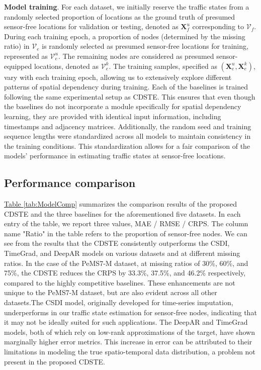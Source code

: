 \documentclass[a4paper,fleqn,12pt]{cas-sc}
\newcommand{\rev}[1]{{\color{red} #1}}
\begin{document}
\rev{\noindent\textbf{Model training}. For each dataset, we initially reserve the traffic states from a randomly selected proportion of locations as the ground truth of presumed sensor-free locations for validation or testing, denoted as $\mathbf{X}^u_f$ corresponding to $\boldsymbol{\mathcal{V}}_f$. During each training epoch, a proportion of nodes (determined by the missing ratio) in $\boldsymbol{\mathcal{V}}_e$ is randomly selected as presumed sensor-free locations for training, represented as $\boldsymbol{\mathcal{V}}^u_e$. The remaining nodes are considered as presumed sensor-equipped locations, denoted as $\boldsymbol{\mathcal{V}}^k_e$. The training samples, specified as $(\mathbf{X}^u_e, \mathbf{X}^k_e)$, vary with each training epoch, allowing us to extensively explore different patterns of spatial dependency during training. Each of the baselines is trained following the same experimental setup as CDSTE. This ensures that even though the baselines do not incorporate a module specifically for spatial dependency learning, they are provided with identical input information, including timestamps and adjacency matrices. Additionally, the random seed and training sequence lengths were standardized across all models to maintain consistency in the training conditions. This standardization allows for a fair comparison of the models' performance in estimating traffic states at sensor-free locations.
}

\subsection{Performance comparison}
\hyperref[tab:ModelComp]{Table \ref{tab:ModelComp}} summarizes the comparison results of the proposed CDSTE and the three baselines for the aforementioned five datasets. In each entry of the table, we report three values, MAE / RMSE / CRPS. The column name "Ratio" in the table refers to the proportion of sensor-free nodes. We can see from the results that the CDSTE consistently outperforms the CSDI, TimeGrad, and DeepAR models on various datasets and at different missing ratios. In the case of the PeMS7-M dataset, at missing ratios of 30\%, 60\%, and 75\%, the CDSTE reduces the CRPS by 33.3\%, 37.5\%, and 46.2\% respectively, compared to the highly competitive baselines. These enhancements are not unique to the PeMS7-M dataset, but are also evident across all other datasets.The CSDI model, originally developed for time-series imputation, underperforms in our traffic state estimation for sensor-free nodes, indicating that it may not be ideally suited for such applications. The DeepAR and TimeGrad models, both of which rely on low-rank approximations of the target, have shown marginally higher error metrics. This increase in error can be attributed to their limitations in modeling the true spatio-temporal data distribution, a problem not present in the proposed CDSTE. 
\end{document}
